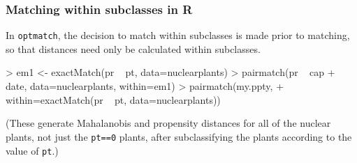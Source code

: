 \begin{frame}[fragile]
  \frametitle{Matching within subclasses in R}

In \texttt{optmatch}, the decision to match within subclasses is made
prior to matching, so that distances need only be calculated within subclasses.

\begin{Schunk}
\begin{Sinput}
> em1 <- exactMatch(pr ~ pt, data=nuclearplants)
> pairmatch(pr ~ cap + date, data=nuclearplants, within=em1) 
> pairmatch(my.ppty, 
+          within=exactMatch(pr ~ pt, data=nuclearplants))
\end{Sinput}
\end{Schunk}


(These generate Mahalanobis and propensity distances for all of the nuclear plants, not just the \texttt{pt==0} plants, after subclassifying the plants according to the value of \texttt{pt}.)
\end{frame}
\note{
}
